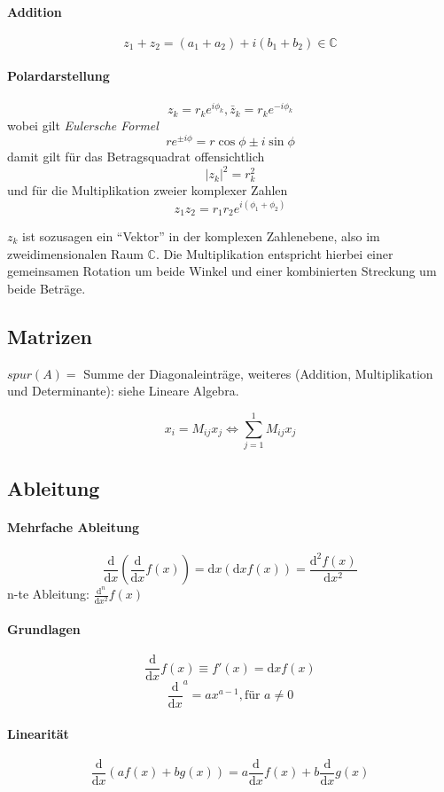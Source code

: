 \documentclass[oneside]{book}
\theoremstyle{definition}
\newcommand\setC{\mathbb C}
\renewcommand{\d}{\mathrm d}
\newcommand{\dd}[1]{\frac{\d}{\d #1}}
\begin{document}
\paragraph{Addition} $$z_1 + z_2 = (a_1 + a_2) + i(b_1 + b_2) \in \setC$$

\paragraph{Polardarstellung}
$$z_k = r_k e^{i \phi_k}, \bar z_k = r_k e^{-i\phi_k}$$
wobei gilt \textit{Eulersche Formel}
$$r e^{\pm i \phi} = r \cos\phi \pm i \sin\phi$$
damit gilt für das Betragsquadrat offensichtlich
$$|z_k|^2 = r_k^2$$
und für die Multiplikation zweier komplexer Zahlen
$$z_1 z_2 = r_1 r_2 e^{i (\phi_1 + \phi_2)}$$

$z_k$ ist sozusagen ein "`Vektor"' in der komplexen Zahlenebene, also im zweidimensionalen Raum $\setC$. Die Multiplikation entspricht hierbei einer gemeinsamen Rotation um beide Winkel und einer kombinierten Streckung um beide Beträge.  

\subsection{Matrizen}
$spur(A) = $ Summe der Diagonaleinträge, weiteres (Addition, Multiplikation und Determinante): siehe Lineare Algebra.

$$x_i = M_{ij} x_j \Leftrightarrow \sum_{j=1}^1 M_{ij} x_j$$

\subsection{Ableitung}

\paragraph{Mehrfache Ableitung}
$$\dd x (\dd x f(x)) = \d x (\d x f(x)) = \frac{\d^2 f(x)}{\d x^2}$$
n-te Ableitung: $\frac{\d^n}{\d x^2} f(x)$

\paragraph{Grundlagen}
$$\dd x f(x) \equiv f'(x) = \d x f(x)$$
$$\dd x^a = a x^{a-1}, \text{für $a \neq 0$}$$

\paragraph{Linearität}
$$\dd x (a f(x) + b g(x)) = a \dd x f(x) + b \dd x g(x)$$
\end{document}
